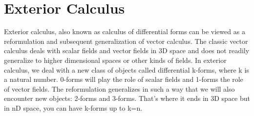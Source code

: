 \section{Exterior Calculus} 
Exterior calculus, also known as calculus of differential forms can be viewed as a reformulation and subsequent generalization of vector calculus. The classic vector calculus deals with scalar fields and vector fields in 3D space and does not readily generalize to higher dimensional spaces or other kinds of fields. In exterior calculus, we deal with a new class of objects called differential k-forms, where k is a natural number. 0-forms will play the role of scalar fields and 1-forms the role of vector fields. The reformulation generalizes in such a way that we will also encounter new objects: 2-forms and 3-forms. That's where it ends in 3D space but in nD space, you can have k-forms up to k=n.
 


